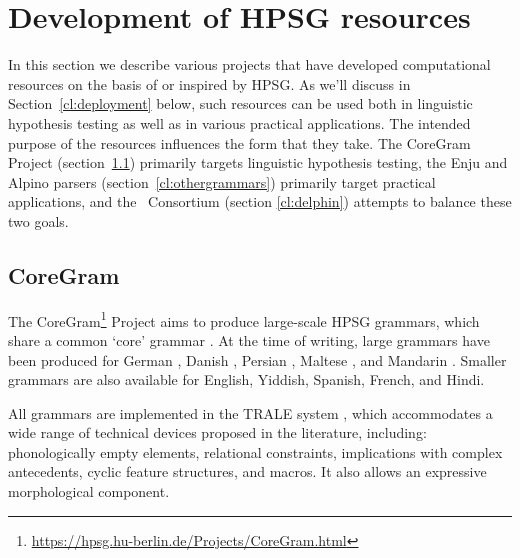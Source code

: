 \documentclass[output=paper,nonflat]{langsci/langscibook}
\begin{document}




\section{Development of HPSG resources}
\label{cl:resources}

In this section we describe various projects that have developed computational resources on the basis of or inspired by HPSG.
As we'll discuss in Section~\ref{cl:deployment} below,
such resources can be used both in linguistic hypothesis testing as well as in various practical applications.
The intended purpose of the resources influences the form that they take.
The CoreGram Project (section~\ref{cl:coregram:1}) primarily targets linguistic hypothesis testing,
the Enju and Alpino parsers (section~\ref{cl:othergrammars}) primarily target practical applications,
and the \delphin\ Consortium (section \ref{cl:delphin}) attempts to balance these two goals.


\subsection{CoreGram}
\label{cl:coregram:1}

The CoreGram\footnote{
	\url{https://hpsg.hu-berlin.de/Projects/CoreGram.html}
} Project
aims to produce large-scale HPSG grammars,
which share a common `core' grammar \citep{MuellerCoreGram}.
At the time of writing, large grammars have been produced for
German \citep{},
Danish \citep{},
Persian \citep{},
Maltese \citep{},
and Mandarin \citep{}.
Smaller grammars are also available for English, Yiddish, Spanish, French, and Hindi.

All grammars are implemented
in the TRALE system \citep{MPR2002a-u,Penn2004a-u},
which accommodates a wide range of technical devices proposed in the literature, including:
phonologically empty elements,
relational constraints,
implications with complex antecedents,
cyclic feature structures,
and macros.
It also allows an expressive morphological component.
\end{document}
